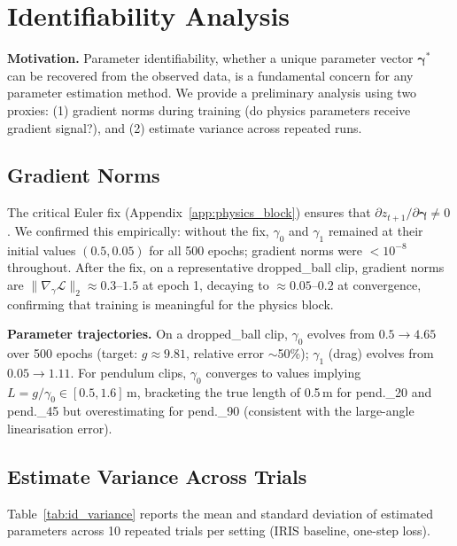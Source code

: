 \documentclass[runningheads]{llncs}
\begin{document}
\section{Identifiability Analysis}
\label{app:identifiability}

\textbf{Motivation.}  Parameter identifiability, whether a unique
parameter vector $\boldsymbol{\gamma}^*$ can be recovered from the observed
data, is a fundamental concern for any parameter estimation method.  We
provide a preliminary analysis using two proxies: (1) gradient norms during
training (do physics parameters receive gradient signal?), and (2) estimate
variance across repeated runs.

\subsection{Gradient Norms}
\label{app:grad_norms}

The critical Euler fix (Appendix~\ref{app:physics_block}) ensures that
$\partial z_{t+1}/\partial\boldsymbol{\gamma} \neq 0$.  We confirmed this
empirically: without the fix, $\gamma_0$ and $\gamma_1$ remained at their
initial values $(0.5, 0.05)$ for all 500 epochs; gradient norms were
$< 10^{-8}$ throughout.  After the fix, on a representative dropped\_ball
clip, gradient norms are $\|\nabla_\gamma \mathcal{L}\|_2 \approx 0.3$--$1.5$
at epoch 1, decaying to $\approx 0.05$--$0.2$ at convergence, confirming
that training is meaningful for the physics block.

\textbf{Parameter trajectories.}  On a dropped\_ball clip, $\gamma_0$
evolves from $0.5 \to 4.65$ over 500 epochs (target: $g \approx 9.81$,
relative error $\sim$50\%); $\gamma_1$ (drag) evolves from $0.05 \to 1.11$.
For pendulum clips, $\gamma_0$ converges to values implying
$L = g/\gamma_0 \in [0.5, 1.6]$\,m, bracketing the true length of 0.5\,m
for pend.\_20 and pend.\_45 but overestimating for pend.\_90 (consistent
with the large-angle linearisation error).

\subsection{Estimate Variance Across Trials}
\label{app:id_variance}

Table~\ref{tab:id_variance} reports the mean and standard deviation of
estimated parameters across 10 repeated trials per setting (IRIS baseline,
one-step loss).
\end{document}
